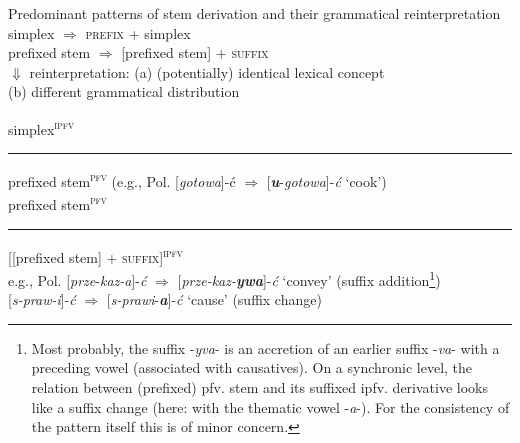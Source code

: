 \documentclass[output=paper,colorlinks,citecolor=brown]{langscibook}
\begin{document}
\ea \footnotesize Predominant patterns of stem derivation and their grammatical reinterpretation \label{ex:wiemer:2}
    \ea \label{ex:wiemer:2a}
    \footnotesize simplex $\Rightarrow$ \textsc{prefix} + simplex\\

    \ex \label{ex:wiemer:2b}
    \hspace{3.5em} \footnotesize prefixed stem $\Rightarrow$ [prefixed stem] + \textsc{suffix} \\
    \hspace{7em} $\Downarrow$ \footnotesize reinterpretation: (a) (potentially) identical lexical concept \\
    \hspace{14.7em} \footnotesize (b) different grammatical distribution\\
    \z
\z

\newpage

\ea \label{ex:wiemer:3}
    \ea \label{ex:wiemer:3a}
    \footnotesize simplex\textsuperscript{\textsc{ipfv}} \rule{0.5cm}{0.1mm} prefixed stem\textsuperscript{\textsc{pfv}} (e.g., Pol. [\textit{gotowa}]-ć $\Rightarrow$ [\textbf{\textit{u}}-\textit{gotowa}]-\textit{ć} ‘cook’)\\
    
    \ex \label{ex:wiemer:3b}
    \hspace{5.2em} \footnotesize prefixed stem\textsuperscript{\textsc{pfv}} \rule{0.5cm}{0.1mm} [[prefixed stem] + \textsc{suffix}]\textsuperscript{\textsc{ipfv}}\\
    \hspace{6.6em}\scriptsize e.g., Pol. [\textit{prze}-\textit{kaz-a}]-\textit{ć} $\Rightarrow$ [\textit{prze-kaz-}\textbf{\textit{ywa}}]-\textit{ć} ‘convey’ (suffix addition\footnote{Most probably, the suffix -\textit{yva}- is an accretion of an earlier suffix -\textit{va}- with a preceding vowel (associated with causatives). On a synchronic level, the relation between (prefixed) pfv. stem and its suffixed ipfv. derivative looks like a suffix change (here: with the thematic vowel -\textit{a}-). For the consistency of the pattern itself this is of minor concern.\label{fn:5}}) \\
    \hspace{7.4em}\scriptsize [\textit{s-praw-i}]-\textit{ć} $\Rightarrow$ [\textit{s-prawi}-\textbf{\textit{a}}]-\textit{ć} ‘cause’ (suffix change) \\
    \z
\z
\end{document}
